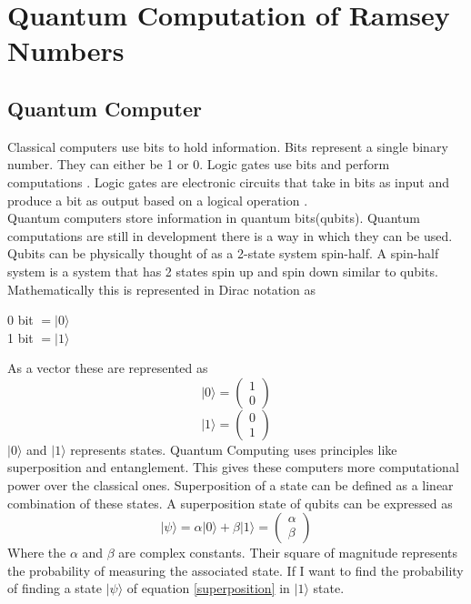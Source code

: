 \documentclass{Assignment}
\begin{document}
\section{Quantum Computation of Ramsey Numbers}
\subsection{Quantum Computer}
Classical computers use bits to hold information.
Bits represent a single binary number.
They can either be 1 or 0.
Logic gates use bits and perform computations \cite{deutsch1985quantum}.
Logic gates are electronic circuits that take in bits as input and produce a bit as output based on a logical operation \cite{Jaeger1997}.\\
Quantum computers store information in quantum bits(qubits).
Quantum computations are still in development there is a way in which they can be used.
Qubits can be physically thought of as a 2-state system spin-half.
A spin-half system is a system that has 2 states spin up and spin down similar to qubits.
Mathematically this is represented in Dirac notation as \begin{center}
	0 bit $=|0\rangle $ \\1 bit $=  |1\rangle$
\end{center}
As a vector these are represented as 
$$|0\rangle = \begin{pmatrix}
	1\\0
\end{pmatrix}$$
$$|1\rangle = \begin{pmatrix}
	0\\1
\end{pmatrix}$$
$|0\rangle$ and $|1\rangle$ represents states.
Quantum Computing uses principles like superposition and entanglement.
This gives these computers more computational power over the classical ones.
Superposition of a state can be defined as a linear combination of these states.\cite{mcintyre_quantum_2012}
A superposition state of qubits can be expressed as \begin{equation}
|\psi\rangle = \alpha|0\rangle + \beta|1\rangle = \begin{pmatrix}
	\alpha\\\beta
\label{superposition}
\end{pmatrix} \end{equation}
Where the $\alpha $ and $ \beta$ are complex constants.
Their square of magnitude represents the probability of measuring the associated state.
If I want to find the probability of finding a state $|\psi\rangle$ of equation \ref{superposition} in $|1\rangle$ state.
\end{document}
